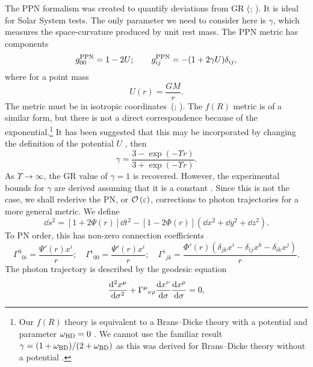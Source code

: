 The PPN formalism was created to quantify deviations from GR (\citealt[chapter 4]{Will1993}; \citealt{Will2006}). It is ideal for Solar System tests. The only parameter we need to consider here is $\gamma$, which measures the space-curvature produced by unit rest mass. The PPN metric has components
\begin{equation}
g^\mathrm{PPN}_{00} = 1 - 2U; \qquad g^\mathrm{PPN}_{ij} = -(1 + 2\gamma U)\delta_{ij},
\end{equation}
where for a point mass
\begin{equation}
U(r) = \dfrac{GM}{r}.
\end{equation}
The metric must be in isotropic coordinates~(\citealt[section 40.1]{Misner1973}; \citealt[section 4.1(c)]{Will1993}). The $f(R)$ metric  is of a similar form, but there is not a direct correspondence because of the exponential.\footnote{Our $f(R)$ theory is equivalent to a Brans--Dicke theory with a potential and parameter $\omega_\mathrm{BD} = 0$ \citep{Teyssandier1983, Wands1994}. We cannot use the familiar result $\gamma = (1 + \omega_\mathrm{BD})/(2 + \omega_\mathrm{BD})$ \citep{Will2006} as this was derived for Brans--Dicke theory without a potential \citep[section 5.3]{Will1993}.} It has been suggested that this may be incorporated by changing the definition of the potential $U$ \citep{Olmo2007c, Faulkner2007, Bisabr2010, DeFelice2010}, then
\begin{equation}
\gamma = \dfrac{3 - \exp(-\Upsilon r)}{3 + \exp(-\Upsilon r)}.
\end{equation}
As $\Upsilon \rightarrow \infty$, the GR value of $\gamma = 1$ is recovered. However, the experimental bounds for $\gamma$ are derived assuming that it is a constant \citep[section 6.1]{Will1993}. Since this is not the case, we shall rederive the PN, or $\mathcal{O}\left({\varepsilon}\right)$, corrections to photon trajectories for a more general metric. We define
\begin{equation}
\dd s^2 = \left[1+2\Psi(r)\right]\dd t^2 - \left[1 - 2\Phi(r)\right]\left(\dd x^2 + \dd y^2 + \dd z^2\right).
\end{equation}
To PN order, this has non-zero connection coefficients
\begin{equation}
{\Gamma^0}_{0i} = \dfrac{\Psi'(r) x^i}{r}; \quad {\Gamma^i}_{00} = \dfrac{\Psi'(r) x^i}{r}; \quad
{\Gamma^i}_{jk} = \dfrac{\Phi'(r)\left(\delta_{jk}x^i - \delta_{ij}x^k - \delta_{ik}x^j\right)}{r}.
\end{equation}
The photon trajectory is described by the geodesic equation
\begin{equation}
\dfrac{\mathrm{d}^2 {x^\mu}}{\mathrm{d} {\sigma}^2} + {\Gamma^\mu}_{\nu\rho}\dfrac{\mathrm{d} {x^\nu}}{\mathrm{d} {\sigma}}\dfrac{\mathrm{d} {x^\rho}}{\mathrm{d} {\sigma}} = 0,
\label{eq:Geodesic}
\end{equation}
